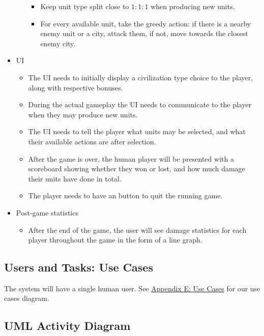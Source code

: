 \documentclass[11pt]{amsart}
\begin{document}
\begin{itemize}
\begin{itemize}
        \begin{itemize}
            \item Keep unit type split close to $1:1:1$ when producing new units.
            \item For every available unit, take the greedy action: if there is a nearby enemy unit or a city, attack them, if not, move towards the closest enemy city.
        \end{itemize}
    \end{itemize}
    \item UI
    \begin{itemize}
        \item The UI needs to initially display a civilization type choice to the player, along with respective bonuses.
        \item During the actual gameplay the UI needs to communicate to the player when they may produce new units.
        \item The UI needs to tell the player what units may be selected, and what their available actions are after selection.
        \item After the game is over, the human player will be presented with a scoreboard showing whether they won or lost, and how much damage their units have done in total.
        \item The player needs to have an button to quit the running game.
    \end{itemize}
    \item Post-game statistics
    \begin{itemize}
        \item After the end of the game, the user will see damage statistics for each player throughout the game in the form of a line graph.
    \end{itemize}
\end{itemize}

\subsection*{Users and Tasks: Use Cases} \phantom{}

The system will have a single human user. See \hyperref[sec:appendixe]{Appendix E: Use Cases} for our use cases diagram.

\subsection*{UML Activity Diagram} \phantom{}
\end{document}
